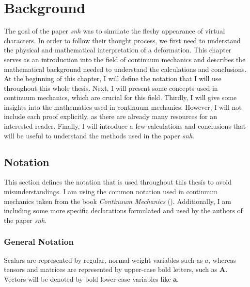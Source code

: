 \chapter{Background} 
\label{c:Background}
The goal of the paper \textit{\acrshort{snh}} was to simulate the fleshy appearance of virtual characters. In order to follow their thought process, we first need to understand the physical and mathematical interpretation of a deformation. This chapter serves as an introduction into the field of continuum mechanics and describes the mathematical background needed to understand the calculations and conclusions. At the beginning of this chapter, I will define the notation that I will use throughout this whole thesis. Next, I will present some concepts used in continuum mechanics, which are crucial for this field. Thirdly, I will give some insights into the mathematics used in continuum mechanics. However, I will not include each proof explicitly, as there are already many resources for an interested reader. Finally, I will introduce a few calculations and conclusions that will be useful to understand the methods used in the paper \textit{\acrshort{snh}}.

\section{Notation}
This section defines the notation that is used throughout this thesis to avoid misunderstandings. I am using the common notation used in continuum mechanics taken from the book \textit{Continuum Mechanics} (\cite{Spencer1980}). Additionally, I am including some more specific declarations formulated and used by the authors of the paper \textit{\acrshort{snh}}.

\subsection{General Notation}
Scalars are represented by regular, normal-weight variables such as $a$, whereas tensors and matrices are represented by upper-case bold letters, such as $\textbf{A}$. Vectors will be denoted by bold lower-case variables like $\textbf{a}$. 

